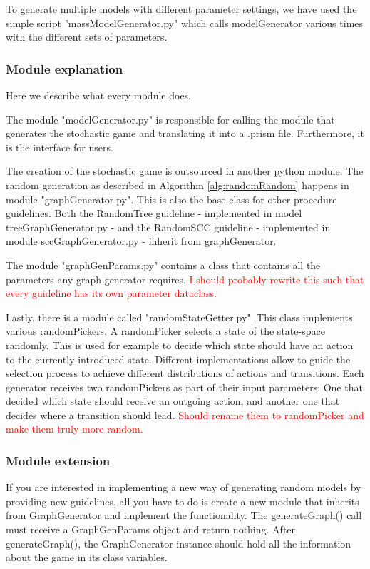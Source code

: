 To generate multiple models with different parameter settings, we have used the simple script "massModelGenerator.py" which calls modelGenerator various times with the different sets of parameters.

\subsubsection*{Module explanation}
Here we describe what every module does.

The module "modelGenerator.py" is responsible for calling the module that generates the stochastic game and translating it into a .prism file. 
Furthermore, it is the interface for users.

The creation of the stochastic game is outsourced in another python module. The random generation as described in Algorithm \ref{alg:randomRandom} happens in
module "graphGenerator.py". This is also the base class for other procedure guidelines. 
Both the RandomTree guideline - implemented in model treeGraphGenerator.py - and the RandomSCC guideline - implemented in module sccGraphGenerator.py - inherit
from graphGenerator.

The module "graphGenParams.py" contains a class that contains all the parameters any graph generator requires. 
\textcolor{red}{I should probably rewrite this such that every guideline has its own parameter dataclass.}

Lastly, there is a module called "randomStateGetter.py". This class implements various randomPickers.
A randomPicker selects a state of the state-space randomly.
This is used for example to decide which state should have an action to the currently introduced state.
Different implementations allow to guide the selection process to achieve different distributions of actions and transitions.
Each generator receives two randomPickers as part of their input parameters: One that decided which state should receive an outgoing action, 
and another one that decides where a transition should lead.
\textcolor{red}{Should rename them to randomPicker and make them truly more random.}

\subsubsection*{Module extension}
If you are interested in implementing a new way of generating random models by providing new guidelines, all you have to do is create a new
module that inherits from GraphGenerator and implement the functionality. The generateGraph() call must receive a GraphGenParams object and return nothing.
After generateGraph(), the GraphGenerator instance should hold all the information about the game in its class variables.